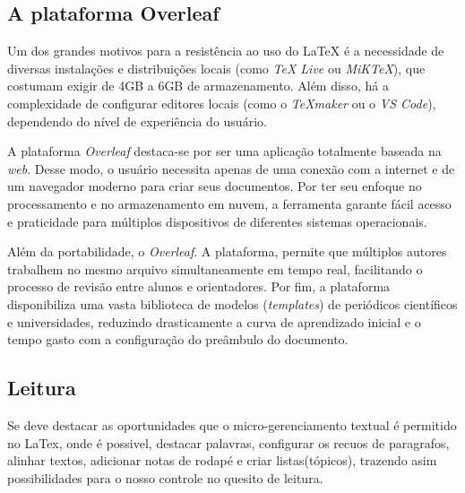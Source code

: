\documentclass[12pt, a4paper]{article}
\begin{document}
\subsection{A plataforma Overleaf}

Um dos grandes motivos para a resistência ao uso do LaTeX é a necessidade de diversas instalações e distribuições locais (como \textit{TeX Live} ou \textit{MiKTeX}), que costumam exigir de 4GB a 6GB de armazenamento. Além disso, há a complexidade de configurar editores locais (como o \textit{TeXmaker} ou o \textit{VS Code}), dependendo do nível de experiência do usuário. 

A plataforma \textit{Overleaf} destaca-se por ser uma aplicação totalmente baseada na \textit{web}. Desse modo, o usuário necessita apenas de uma conexão com a internet e de um navegador moderno para criar seus documentos. Por ter seu enfoque no processamento e no armazenamento em nuvem, a ferramenta garante fácil acesso e praticidade para múltiplos dispositivos de diferentes sistemas operacionais.

Além da portabilidade, o \textit{Overleaf}. A plataforma, permite que múltiplos autores trabalhem no mesmo arquivo simultaneamente em tempo real, facilitando o processo de revisão entre alunos e orientadores. Por fim, a plataforma disponibiliza uma vasta biblioteca de modelos (\textit{templates}) de periódicos científicos e universidades, reduzindo drasticamente a curva de aprendizado inicial e o tempo gasto com a configuração do preâmbulo do documento.






















\subsection{Leitura}

Se deve destacar as oportunidades que o micro-gerenciamento textual é permitido no LaTex, onde é possivel, destacar palavras, configurar os recuos de paragrafos, alinhar textos, adicionar notas de rodapé e criar listas(tópicos), trazendo asim possibilidades para o nosso controle no quesito de leitura.
\end{document}
